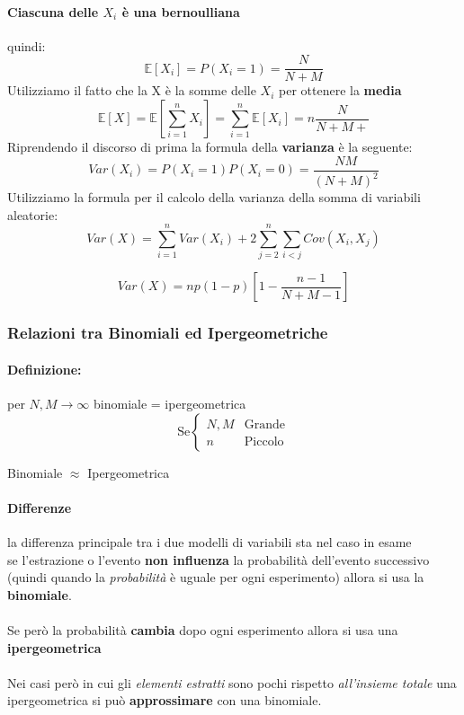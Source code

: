 \documentclass[]{article}
\newcommand{\ev}{\mathbb{E}[X]}
\renewcommand{\ev}[1]{\mathbb{E}[#1]}
\newcommand{\definizione}{\paragraph{Definizione:}}
\begin{document}
    \paragraph{Ciascuna delle $X_i$ è una bernoulliana} quindi:
    \[\ev{X_i} = P(X_i = 1) = \frac{N}{N + M}\]
    Utilizziamo il fatto che la X è la somme delle $X_i$ per ottenere la \textbf{media}
    \[ \ev{X} = \ev{\sum_{i = 1}^{n} X_i} = \sum_{i = 1}^{n} \ev{X_i} = n \frac{N}{N + M+}\]
    Riprendendo il discorso di prima la formula della \textbf{varianza} è la seguente:
    \[ Var(X_i) = P(X_i = 1) P(X_i = 0) = \frac{N M}{(N + M)^2}\]
    Utilizziamo la formula per il calcolo della varianza della somma di variabili aleatorie:
    \[ Var(X) = \sum_{i = 1}^{n} Var(X_i) + 2 \sum_{j = 2}^{n} \sum_{i < j}^{} Cov(X_i, X_j) \]  

    \[ Var(X) = np(1-p)[1 - \frac{n - 1}{N + M - 1}]\]

    \subsubsection{Relazioni tra Binomiali ed Ipergeometriche}
    \definizione per $N, M \longrightarrow \infty$ binomiale = ipergeometrica
    \begin{equation*}
        \text{Se}
        \begin{cases}
            N, M & \text{Grande} \\
            n & \text{Piccolo}
        \end{cases}
    \end{equation*}
    \centerline{Binomiale $\approx$ Ipergeometrica}
    \paragraph{Differenze} la differenza principale tra i due modelli di variabili sta nel caso in esame \\
    se l'estrazione o l'evento \textbf{non influenza} la probabilità dell'evento successivo (quindi quando la \textit{probabilità} è uguale per ogni esperimento) allora si usa la \textbf{binomiale}. \\ \\
    Se però la probabilità \textbf{cambia} dopo ogni esperimento allora si usa una \textbf{ipergeometrica} \\ \\
    Nei casi però in cui gli \textit{elementi estratti} sono pochi rispetto \textit{all'insieme totale} una ipergeometrica si può \textbf{approssimare} con una binomiale. \\
\end{document}
